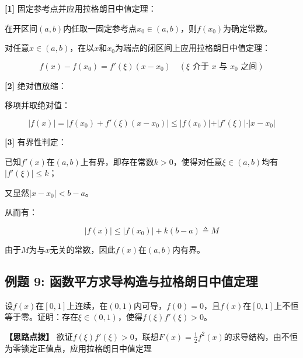 \documentclass[11pt,a4paper,UTF8]{ctexart}
\begin{document}
\begin{solbox}[分步推导与答题规范]
\textbf{[1]} 固定参考点并应用拉格朗日中值定理：

在开区间$(a, b)$内任取一固定参考点$x_0 \in (a, b)$，则$f(x_0)$为确定常数。

对任意$x \in (a, b)$，在以$x$和$x_0$为端点的闭区间上应用拉格朗日中值定理：


\begin{equation*}
f(x) - f(x_0) = f'(\xi)(x - x_0) \quad (\xi \text{ 介于 } x \text{ 与 } x_0 \text{ 之间})
\end{equation*}


\textbf{[2]} 绝对值放缩：

移项并取绝对值：


\begin{equation*}
\vert{}f(x)\vert{} = \vert{}f(x_0) + f'(\xi)(x - x_0)\vert{} \le \vert{}f(x_0)\vert{} + \vert{}f'(\xi)\vert{} \cdot \vert{}x - x_0\vert{}
\end{equation*}


\textbf{[3]} 有界性判定：

已知$f'(x)$在$(a, b)$上有界，即存在常数$k > 0$，使得对任意$\xi \in (a, b)$均有$\vert{}f'(\xi)\vert{} \le k$；

又显然$\vert{}x - x_0\vert{} < b - a$。

从而有：


\begin{equation*}
\vert{}f(x)\vert{} \le \vert{}f(x_0)\vert{} + k(b - a) \triangleq M
\end{equation*}


由于$M$为与$x$无关的常数，因此$f(x)$在$(a, b)$内有界。
\end{solbox}


\subsection{例题 9: 函数平方求导构造与拉格朗日中值定理}

设$f(x)$在$[0, 1]$上连续，在$(0, 1)$内可导，$f(0) = 0$，且$f(x)$在$[0, 1]$上不恒等于零。证明：存在$\xi \in (0, 1)$，使得$f(\xi)f'(\xi) > 0$。

\textbf{\color{DeepPurple}【思路点拨】} 欲证$f(\xi)f'(\xi) > 0$，联想$F(x) = \frac{1}{2}f^2(x)$的求导结构，由不恒为零锁定正值点，应用拉格朗日中值定理
\end{document}
